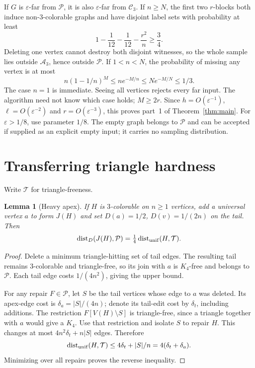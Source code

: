 \documentclass[11pt]{article}
\newtheorem{lemma}[theorem]{Lemma}
\newcommand{\dist}{\operatorname{dist}}
\newcommand{\TF}{\mathcal T}
\newcommand{\Cthree}{\mathcal C_3}
\newcommand{\Athree}{\mathcal A_3}
\newcommand{\PP}{\mathcal P}
\newcommand{\eps}{\varepsilon}
\begin{document}
If $G$ is $\eps$-far from $\PP$, it is also $\eps$-far from
$\Cthree$. If $n\ge N$, the first two $r$-blocks both induce
non-$3$-colorable graphs and have disjoint label sets with probability
at least
\[
              1-\frac1{12}-\frac1{12}-\frac{r^2}{n}\ge\frac34 .
\]
Deleting one vertex cannot destroy both disjoint witnesses, so the
whole sample lies outside $\Athree$, hence outside $\PP$.
If $1<n<N$, the probability of missing any vertex is at most
\[
 n(1-1/n)^M\le n e^{-M/n}\le N e^{-M/N}\le1/3 .
\]
The case $n=1$ is immediate. Seeing all vertices rejects every far
input. The algorithm need not know which case holds; $M\ge2r$.
Since $h=O(\eps^{-1})$, $\ell=O(\eps^{-2})$ and $r=O(\eps^{-3})$,
this proves part~1 of Theorem~\ref{thm:main}. For $\eps>1/8$, use
parameter $1/8$. The empty graph belongs to $\PP$ and can be accepted
if supplied as an explicit empty input; it carries no sampling
distribution.

\section{Transferring triangle hardness}
Write $\TF$ for triangle-freeness.

\begin{lemma}[Heavy apex]\label{lem:apex}
If $H$ is $3$-colorable on $n\ge1$ vertices, add a universal vertex $a$
to form $J(H)$ and set $D(a)=1/2$, $D(v)=1/(2n)$ on the tail. Then
\[
             \dist_D(J(H),\PP)=\tfrac14\dist_{\rm unif}(H,\TF).
\]
\end{lemma}
\begin{proof}
Delete a minimum triangle-hitting set of tail edges. The resulting
tail remains $3$-colorable and triangle-free, so its join with $a$ is
$K_4$-free and belongs to $\PP$. Each tail edge costs $1/(4n^2)$,
giving the upper bound.

For any repair $F\in\PP$, let $S$ be the tail vertices whose edge to
$a$ was deleted. Its apex-edge cost is $\delta_a=|S|/(4n)$; denote
its tail-edit cost by $\delta_t$, including additions. The restriction
$F[V(H)\setminus S]$ is triangle-free, since a triangle together with
$a$ would give a $K_4$. Use that restriction and isolate $S$ to repair
$H$. This changes at most $4n^2\delta_t+n|S|$ edges. Therefore
\[
 \dist_{\rm unif}(H,\TF)\le4\delta_t+|S|/n
                      =4(\delta_t+\delta_a).
\]
Minimizing over all repairs proves the reverse inequality.
\end{proof}
\end{document}
